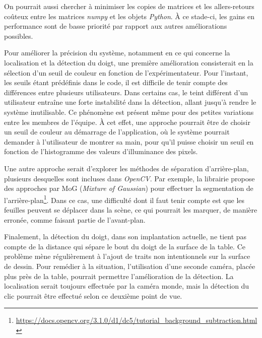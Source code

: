 \documentclass[11pt]{report}
\begin{document}
On pourrait aussi chercher à minimiser les copies de matrices et les
allers-retours coûteux entre les matrices \textit{numpy} et les objets
\textit{Python}. À ce stade-ci, les gains en performance sont de basse priorité
par rapport aux autres améliorations possibles.

Pour améliorer la précision du système, notamment en ce qui concerne la
localisation et la détection du doigt, une première amélioration consisterait en
la sélection d'un seuil de couleur en fonction de l'expérimentateur. Pour
l'instant, les seuils étant prédéfinis dans le code, il est difficile de tenir
compte des différences entre plusieurs utilisateurs. Dans certains cas, le teint
différent d'un utilisateur entraîne une forte instabilité dans la détection,
allant jusqu'à rendre le système inutilisable. Ce phénomène est présent même
pour des petites variations entre les membres de l'équipe. À cet effet, une
approche pourrait être de choisir un seuil de couleur au démarrage de
l'application, où le système pourrait demander à l'utilisateur de montrer sa
main, pour qu'il puisse choisir un seuil en fonction de l'histogramme des
valeurs d'illuminance des pixels.

Une autre approche serait d'explorer les méthodes de séparation d'arrière-plan,
plusieurs desquelles sont incluses dans \textit{OpenCV}. Par exemple, la
librairie propose des approches par MoG (\textit{Mixture of Gaussian}) pour
effectuer la segmentation de
l'arrière-plan\footnote{\url{https://docs.opencv.org/3.1.0/d1/dc5/tutorial_background_subtraction.html}}.
Dans ce cas, une difficulté dont il faut tenir compte est que les feuilles
peuvent se déplacer dans la scène, ce qui pourrait les marquer, de manière
erronée, comme faisant partie de l'avant-plan. 

Finalement, la détection du doigt, dans son implantation actuelle, ne tient pas
compte de la distance qui sépare le bout du doigt de la surface de la table. Ce
problème mène régulièrement à l'ajout de traits non intentionnels sur la surface de
dessin. Pour remédier à la situation, l'utilisation d'une seconde caméra, placée
plus près de la table, pourrait permettre l'amélioration de la détection. La
localisation serait toujours effectuée par la caméra monde, mais la détection du
clic pourrait être effectué selon ce deuxième point de vue. 
\end{document}
